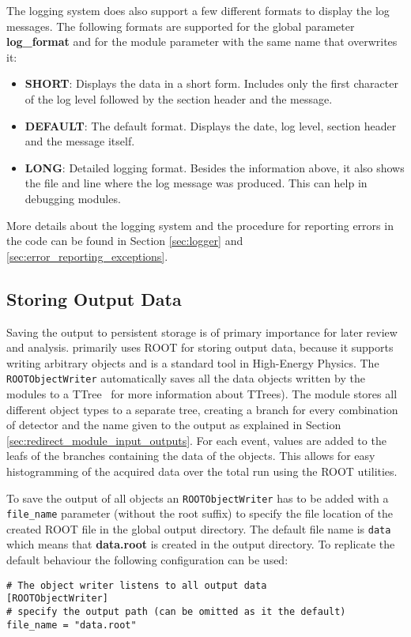 The logging system does also support a few different formats to display the log messages. The following formats are supported for the global parameter \textbf{log\_format} and for the module parameter with the same name that overwrites it:
\begin{itemize}
\item \textbf{SHORT}: Displays the data in a short form. Includes only the first character of the log level followed by the section header and the message.
\item \textbf{DEFAULT}: The default format. Displays the date, log level, section header and the message itself. 
\item \textbf{LONG}: Detailed logging format. Besides the information above, it also shows the file and line where the log message was produced. This can help in debugging modules.
\end{itemize}

More details about the logging system and the procedure for reporting errors in the code can be found in Section \ref{sec:logger} and \ref{sec:error_reporting_exceptions}.

\subsection{Storing Output Data}
Saving the output to persistent storage is of primary importance for later review and analysis. \apsq primarily uses ROOT for storing output data, because it supports writing arbitrary objects and is a standard tool in High-Energy Physics. The \texttt{ROOTObjectWriter} automatically saves all the data objects written by the modules to a TTree~\cite{roottree} for more information about TTrees). The module stores all different object types to a separate tree, creating a branch for every combination of detector and the name given to the output as explained in Section \ref{sec:redirect_module_input_outputs}. For each event, values are added to the leafs of the branches containing the data of the objects. This allows for easy histogramming of the acquired data over the total run using the ROOT utilities.

To save the output of all objects an \texttt{ROOTObjectWriter} has to be added with a \texttt{file\_name} parameter (without the root suffix) to specify the file location of the created ROOT file in the global output directory. The default file name is \texttt{data} which means that \textbf{data.root} is created in the output directory. To replicate the default behaviour the following configuration can be used:
\begin{verbatim}
# The object writer listens to all output data
[ROOTObjectWriter]
# specify the output path (can be omitted as it the default)
file_name = "data.root"
\end{verbatim}

